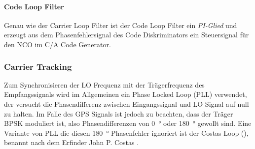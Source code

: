 \paragraph{Code Loop Filter} Genau wie der Carrier Loop Filter ist der Code Loop Filter ein \emph{PI-Glied} und erzeugt aus dem Phasenfehlersignal des Code Diskriminators ein Steuersignal für den NCO im C/A Code Generator.

\subsubsection{Carrier Tracking}
Zum Synchronisieren der LO Frequenz mit der Trägerfrequenz des Empfangssignals wird im Allgemeinen ein Phase Locked Loop (PLL) verwendet, der versucht die Phasendifferenz zwischen Eingangssignal und LO Signal auf null zu halten. Im Falle des GPS Signals ist jedoch zu beachten, dass der Träger BPSK moduliert ist, also Phasendifferenzen von \SI{0}{\degree} oder \SI{180}{\degree} gewollt sind. Eine Variante von PLL die diesen \SI{180}{\degree} Phasenfehler ignoriert ist der Costas Loop (), benannt nach dem Erfinder John P. Costas \cite{CostasSyncComm}.


